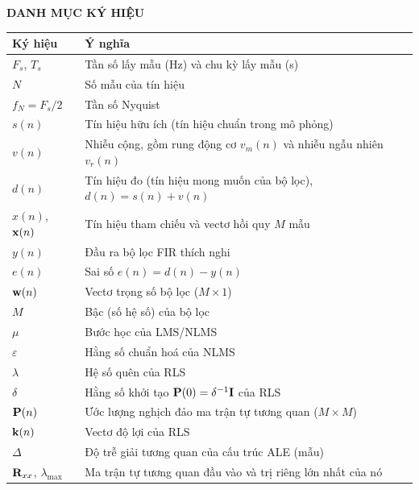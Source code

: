 \documentclass[../main.tex]{subfiles}
\begin{document}
\begin{center}
    \Large{\textbf{DANH MỤC KÝ HIỆU}}
\end{center}
\vspace{0.3cm}

\begin{center}
\renewcommand{\arraystretch}{1.25}
\begin{tabular}{@{}p{3cm}p{10.5cm}@{}}
\toprule
\textbf{Ký hiệu} & \textbf{Ý nghĩa} \\
\midrule
$F_s$, $T_s$ & Tần số lấy mẫu (Hz) và chu kỳ lấy mẫu (s) \\
$N$ & Số mẫu của tín hiệu \\
$f_N=F_s/2$ & Tần số Nyquist \\
$s(n)$ & Tín hiệu hữu ích (tín hiệu chuẩn trong mô phỏng) \\
$v(n)$ & Nhiễu cộng, gồm rung động cơ $v_m(n)$ và nhiễu ngẫu nhiên $v_r(n)$ \\
$d(n)$ & Tín hiệu đo (tín hiệu mong muốn của bộ lọc), $d(n)=s(n)+v(n)$ \\
$x(n)$, $\mathbf{x}(n)$ & Tín hiệu tham chiếu và vectơ hồi quy $M$ mẫu \\
$y(n)$ & Đầu ra bộ lọc FIR thích nghi \\
$e(n)$ & Sai số $e(n)=d(n)-y(n)$ \\
$\mathbf{w}(n)$ & Vectơ trọng số bộ lọc ($M\times 1$) \\
$M$ & Bậc (số hệ số) của bộ lọc \\
$\mu$ & Bước học của LMS/NLMS \\
$\varepsilon$ & Hằng số chuẩn hoá của NLMS \\
$\lambda$ & Hệ số quên của RLS \\
$\delta$ & Hằng số khởi tạo $\mathbf{P}(0)=\delta^{-1}\mathbf{I}$ của RLS \\
$\mathbf{P}(n)$ & Ước lượng nghịch đảo ma trận tự tương quan ($M\times M$) \\
$\mathbf{k}(n)$ & Vectơ độ lợi của RLS \\
$\Delta$ & Độ trễ giải tương quan của cấu trúc ALE (mẫu) \\
$\mathbf{R}_{xx}$, $\lambda_{\max}$ & Ma trận tự tương quan đầu vào và trị riêng lớn nhất của nó \\
\bottomrule
\end{tabular}
\end{center}
\end{document}
